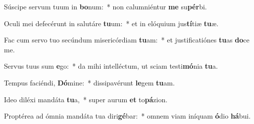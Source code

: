 \item Súscipe servum tuum in \textbf{bo}num:~* non calumniéntur \textbf{me} su\textbf{pér}bi.
\item Oculi mei defecérunt in salutáre \textbf{tu}um:~* et in elóquium jus\textbf{tí}tiæ \textbf{tu}æ.
\item Fac cum servo tuo secúndum misericórdiam \textbf{tu}am:~* et justificatiónes \textbf{tu}as \textbf{do}ce me.
\item Servus tuus sum \textbf{e}go:~* da mihi intelléctum, ut sciam testi\textbf{mó}nia \textbf{tu}a.
\item Tempus faciéndi, \textbf{Dó}mine:~* dissipavérunt \textbf{le}gem \textbf{tu}am.
\item Ideo diléxi mandáta \textbf{tu}a,~* super aurum \textbf{et} to\textbf{pá}zion.
\item Proptérea ad ómnia mandáta tua diri\textbf{gé}bar:~* omnem viam iníquam \textbf{ó}dio \textbf{há}bui.
